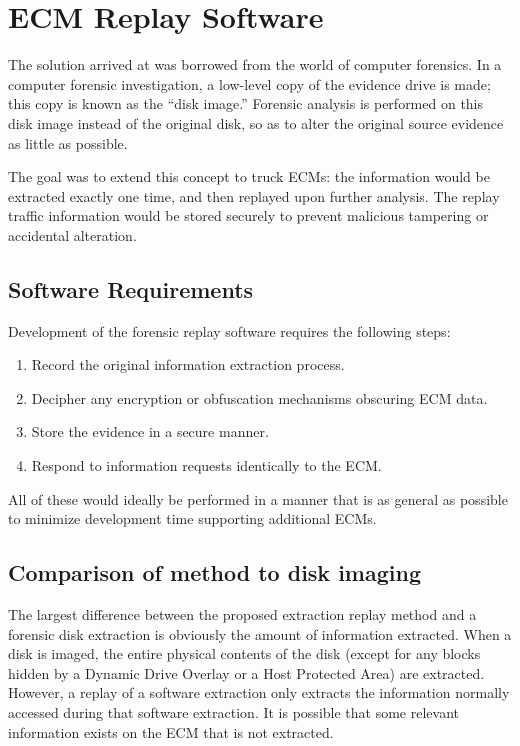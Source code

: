 \chapter{ECM Replay Software}

The solution arrived at was borrowed from the world of computer forensics. In a computer forensic investigation,
a low-level copy of the evidence drive is made; this copy is known as the ``disk image.'' Forensic analysis
is performed on this disk image instead of the original disk, so as to alter the original source evidence as
little as possible.

The goal was to extend this concept to truck ECMs: the information would be extracted exactly one time, and then
replayed upon further analysis. The replay traffic information would be stored securely to prevent malicious tampering
or accidental alteration.

\section{Software Requirements}

Development of the forensic replay software requires the following steps:

\begin{enumerate}
  \item Record the original information extraction process.
  \item Decipher any encryption or obfuscation mechanisms obscuring ECM data.
  \item Store the evidence in a secure manner.
  \item Respond to information requests identically to the ECM.
\end{enumerate}

All of these would ideally be performed in a manner that is as general as possible to minimize development time
supporting additional ECMs.

\section{Comparison of method to disk imaging}

The largest difference between the proposed extraction replay method and a forensic disk extraction is obviously
the amount of information extracted. When a disk is imaged, the entire physical contents of the disk (except for
any blocks hidden by a Dynamic Drive Overlay or a Host Protected Area) are extracted. However, a replay of a
software extraction only extracts the information normally accessed during that software extraction. It is possible
that some relevant information exists on the ECM that is not extracted.

